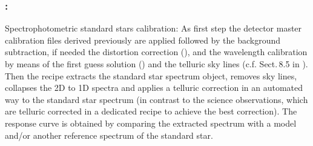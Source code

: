 %

\subsubsection{:}
Spectrophotometric standard stars calibration: As first step the detector master calibration files derived previously are applied followed by the background subtraction, if needed the distortion correction (), and
the wavelength calibration by means of the first guess solution () and the telluric sky lines (c.f. Sect.\,8.5 in \cite{DRLS}). Then the recipe extracts the standard star spectrum object, removes sky lines, collapses the 2D to 1D spectra and applies a telluric correction in an automated way to the standard star spectrum (in contrast to the science observations, which are telluric corrected in a dedicated recipe to achieve the best correction). The response curve is obtained by comparing the extracted spectrum with a model and/or another reference spectrum of the
standard star.
